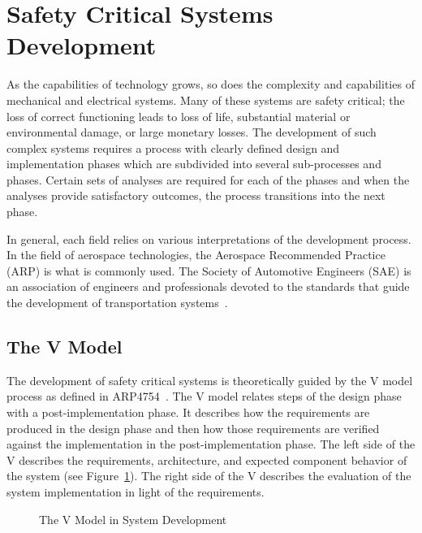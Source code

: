 \section{Safety Critical Systems Development}
\label{sec:criticalSysDev}
As the capabilities of technology grows, so does the complexity and capabilities of mechanical and electrical systems. Many of these systems are safety critical; the loss of correct functioning leads to loss of life, substantial material or environmental damage, or large monetary losses. The development of such complex systems requires a process with clearly defined design and implementation phases which are subdivided into several sub-processes and phases. Certain sets of analyses are required for each of the phases and when the analyses provide satisfactory outcomes, the process transitions into the next phase. 

In general, each field relies on various interpretations of the development process. In the field of aerospace technologies, the Aerospace Recommended Practice (ARP) is what is commonly used. The Society of Automotive Engineers (SAE) is an association of engineers and professionals devoted to the standards that guide the development of transportation systems~\cite{SAE:ARP4761, SAE:ARP4754A}. 

\subsection{The V Model}
The development of safety critical systems is theoretically guided by the V model process as defined in ARP4754~\cite{SAE:ARP4754A}. The V model relates steps of the design phase with a post-implementation phase. It describes how the requirements are produced in the design phase and then how those requirements are verified against the implementation in the post-implementation phase. The left side of the V describes the requirements, architecture, and expected component behavior of the system (see Figure~\ref{fig:v1}). The right side of the V describes the evaluation of the system implementation in light of the requirements. 

\begin{figure}[!htb]
        \caption{\label{fig:v1} The V Model in System Development}
\end{figure}

